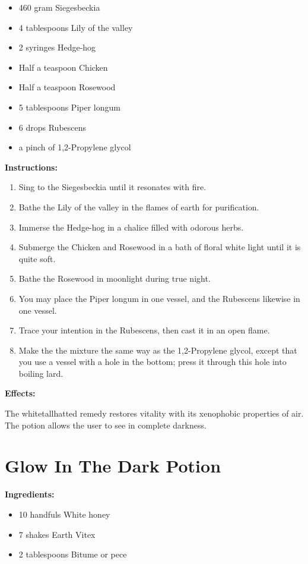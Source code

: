 \documentclass{article}
\begin{document}
\begin{itemize}
  \item 460 gram Siegesbeckia
  \item 4 tablespoons Lily of the valley
  \item 2 syringes Hedge-hog
  \item Half a teaspoon Chicken
  \item Half a teaspoon Rosewood
  \item 5 tablespoons Piper longum
  \item 6 drops Rubescens
  \item a pinch of 1,2-Propylene glycol
\end{itemize}

\textbf{Instructions:}

\begin{enumerate}
  \item Sing to the Siegesbeckia until it resonates with fire.
  \item Bathe the Lily of the valley in the flames of earth for purification.
  \item Immerse the Hedge-hog in a chalice filled with odorous herbs.
  \item Submerge the Chicken and Rosewood in a bath of floral white light until it is quite soft.
  \item Bathe the Rosewood in moonlight during true night.
  \item You may place the Piper longum in one vessel, and the Rubescens likewise in one vessel.
  \item Trace your intention in the Rubescens, then cast it in an open flame.
  \item Make the the mixture the same way as the 1,2-Propylene glycol, except that you use a vessel with a hole in the bottom; press it through this hole into boiling lard.
\end{enumerate}

\textbf{Effects:}

The whitetallhatted remedy restores vitality with its xenophobic properties of air. The potion allows the user to see in complete darkness.

\newpage
\section*{Glow In The Dark Potion}

\textbf{Ingredients:}

\begin{itemize}
  \item 10 handfuls White honey
  \item 7 shakes Earth Vitex
  \item 2 tablespoons Bitume or pece
\end{itemize}
\end{document}
